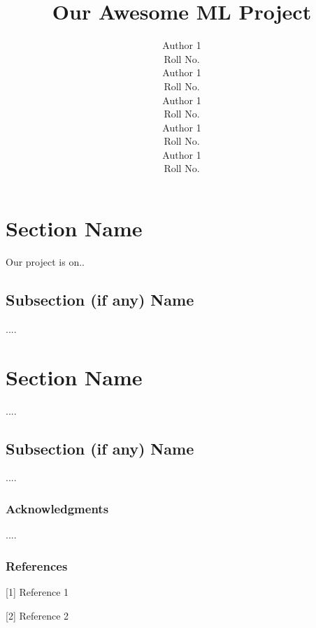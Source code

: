 \documentclass{article} %
\title{Our Awesome ML Project}
\author{
Author 1 \\
Roll No. \\
\And
Author 1 \\
Roll No. \\
\AND
Author 1 \\
Roll No. \\
\And
Author 1 \\
Roll No. \\
\And
Author 1 \\
Roll No. \\
}
\begin{document}
\maketitle

\section{Section Name}

Our project is on..

\subsection{Subsection (if any) Name}

....

\section{Section Name}

....

\subsection{Subsection (if any) Name}

....


\subsubsection*{Acknowledgments}

....

\subsubsection*{References}

\small{
[1] Reference 1

[2] Reference 2
}
\end{document}
